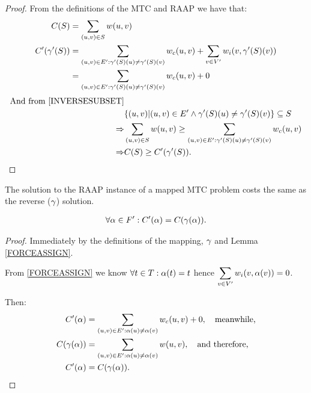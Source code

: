 \begin{proof}
From the definitions of the MTC and RAAP we have that:
\begin{align}
	\nonumber C(S) & = \displaystyle\sum\limits_{(u,v) \in S} w(u,v)\\
	\nonumber C'(\gamma'(S)) & = \displaystyle\sum\limits_{(u,v) \in E' : \gamma'(S)(u) \neq \gamma'(S)(v)} w_c(u,v) + \displaystyle\sum\limits_{v \in V'} w_i(v, \gamma'(S)(v)) \\
	\nonumber & = \displaystyle\sum\limits_{(u,v) \in E' : \gamma'(S)(u) \neq \gamma'(S)(v)} w_c(u,v) + 0
\end{align}
\begin{align}
	\nonumber \mbox{And from \ref{INVERSESUBSET}} & \\
	\nonumber & \{(u,v) | (u,v) \in E' \wedge \gamma'(S)(u) \neq \gamma'(S)(v)\} \subseteq S \\
	\nonumber \Rightarrow & \displaystyle\sum\limits_{(u,v) \in S} w(u,v) \geq \displaystyle\sum\limits_{(u,v) \in E' : \gamma'(S)(u) \neq \gamma'(S)(v)} w_c(u,v) \\
	\nonumber \Rightarrow & C(S) \geq C'(\gamma'(S)).
\end{align}
\end{proof}

\begin{lemma}
\label{REVERSECOST}
The solution to the RAAP instance of a mapped MTC problem costs the same as the reverse ($\gamma$) solution.

\begin{align}
	\nonumber \forall \alpha \in F' : C'(\alpha) = C(\gamma(\alpha)).
\end{align}
\end{lemma}

\begin{proof}
Immediately by the definitions of the mapping, $\gamma$ and Lemma \ref{FORCEASSIGN}.

From \ref{FORCEASSIGN} we know $\forall t \in T : \alpha(t) = t$ hence $\displaystyle\sum\limits_{v \in V'} w_i(v, \alpha(v)) = 0$.

Then:
\begin{align}
	\nonumber C'(\alpha) & = \displaystyle\sum\limits_{(u,v) \in E' : \alpha(u) \neq \alpha(v)} w_c(u,v) + 0,\quad  \mbox{meanwhile,} \\
	\nonumber C(\gamma(\alpha)) & = \displaystyle\sum\limits_{(u,v) \in E' : \alpha(u) \neq \alpha(v)} w(u,v), \quad \mbox{and therefore,} \\
	\nonumber C'(\alpha) & = C(\gamma(\alpha)).
\end{align}
\end{proof}

